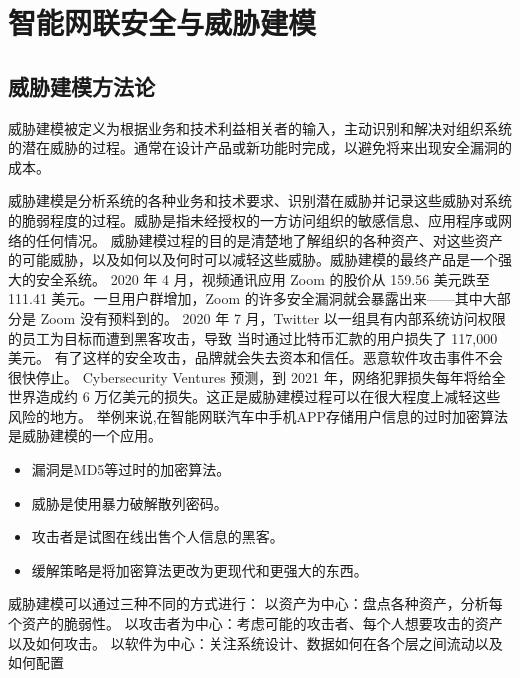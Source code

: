 \chapter{智能网联安全与威胁建模}
\label{ch3}



\section{威胁建模方法论}
威胁建模被定义为根据业务和技术利益相关者的输入，主动识别和解决对组织系统的潜在威胁的过程。通常在设计产品或新功能时完成，以避免将来出现安全漏洞的成本。

威胁建模是分析系统的各种业务和技术要求、识别潜在威胁并记录这些威胁对系统的脆弱程度的过程。威胁是指未经授权的一方访问组织的敏感信息、应用程序或网络的任何情况。 
威胁建模过程的目的是清楚地了解组织的各种资产、对这些资产的可能威胁，以及如何以及何时可以减轻这些威胁。威胁建模的最终产品是一个强大的安全系统。 
2020 年 4 月，视频通讯应用 Zoom 的股价从 159.56 美元跌至 111.41 美元。一旦用户群增加，Zoom 的许多安全漏洞就会暴露出来——其中大部分是 Zoom 没有预料到的。
2020 年 7 月，Twitter 以一组具有内部系统访问权限的员工为目标而遭到黑客攻击，导致 当时通过比特币汇款的用户损失了 117,000 美元。 
有了这样的安全攻击，品牌就会失去资本和信任。恶意软件攻击事件不会很快停止。
Cyber​​security Ventures 预测\cite{apache1}，到 2021 年，网络犯罪损失每年将给全世界造成约 6 万亿美元的损失。这正是威胁建模过程可以在很大程度上减轻这些风险的地方。 
\newline
举例来说,在智能网联汽车中手机APP存储用户信息的过时加密算法是威胁建模的一个应用。
\begin{itemize}
    \item 漏洞是MD5等过时的加密算法。
    \item 威胁是使用暴力破解散列密码。
    \item 攻击者是试图在线出售个人信息的黑客。
    \item 缓解策略是将加密算法更改为更现代和更强大的东西。
  \end{itemize}
威胁建模可以通过三种不同的方式进行： 
\newline
以资产为中心：盘点各种资产，分析每个资产的脆弱性。
\newline 
以攻击者为中心：考虑可能的攻击者、每个人想要攻击的资产以及如何攻击。
\newline
以软件为中心：关注系统设计、数据如何在各个层之间流动以及如何配置
